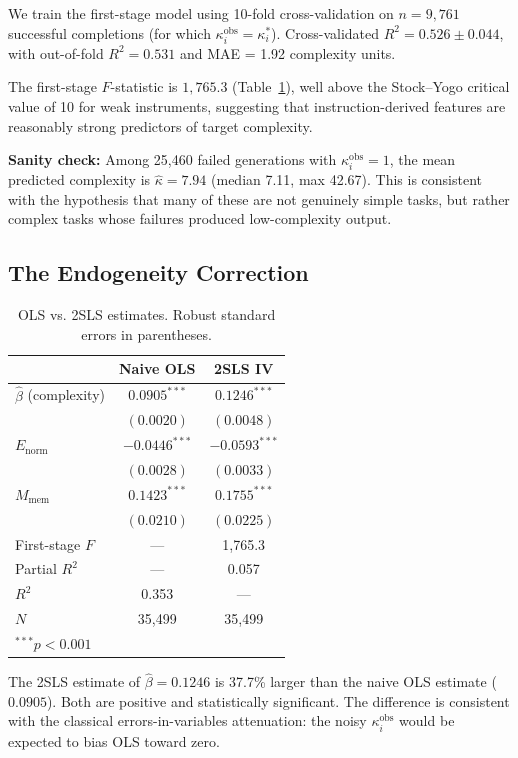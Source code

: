 \documentclass[conference]{IEEEtran}
\begin{document}
We train the first-stage model using 10-fold cross-validation on $n = 9{,}761$ successful completions (for which $\kappa_i^{\text{obs}} = \kappa_i^*$). Cross-validated $R^2 = 0.526 \pm 0.044$, with out-of-fold $R^2 = 0.531$ and MAE = 1.92 complexity units.

The first-stage $F$-statistic is $1{,}765.3$ (Table~\ref{tab:2sls}), well above the Stock--Yogo critical value of 10 for weak instruments, suggesting that instruction-derived features are reasonably strong predictors of target complexity.

\textbf{Sanity check:} Among 25,460 failed generations with $\kappa_i^{\text{obs}} = 1$, the mean predicted complexity is $\hat{\kappa} = 7.94$ (median 7.11, max 42.67). This is consistent with the hypothesis that many of these are not genuinely simple tasks, but rather complex tasks whose failures produced low-complexity output.

\subsection{The Endogeneity Correction}

\begin{table}[h]
\centering
\caption{OLS vs. 2SLS estimates. Robust standard errors in parentheses.}
\label{tab:2sls}
\begin{tabular}{@{}lcc@{}}
\toprule
 & \textbf{Naive OLS} & \textbf{2SLS IV} \\
\midrule
$\hat{\beta}$ (complexity) & $0.0905^{***}$ & $0.1246^{***}$ \\
 & $(0.0020)$ & $(0.0048)$ \\
$E_{\text{norm}}$ & $-0.0446^{***}$ & $-0.0593^{***}$ \\
 & $(0.0028)$ & $(0.0033)$ \\
$M_{\text{mem}}$ & $0.1423^{***}$ & $0.1755^{***}$ \\
 & $(0.0210)$ & $(0.0225)$ \\
\midrule
First-stage $F$ & --- & 1,765.3 \\
Partial $R^2$ & --- & 0.057 \\
$R^2$ & 0.353 & --- \\
$N$ & 35,499 & 35,499 \\
\bottomrule
\multicolumn{3}{l}{\footnotesize $^{***}p < 0.001$}
\end{tabular}
\end{table}

The 2SLS estimate of $\hat{\beta} = 0.1246$ is 37.7\% larger than the naive OLS estimate ($0.0905$). Both are positive and statistically significant. The difference is consistent with the classical errors-in-variables attenuation: the noisy $\kappa_i^{\text{obs}}$ would be expected to bias OLS toward zero.
\end{document}
